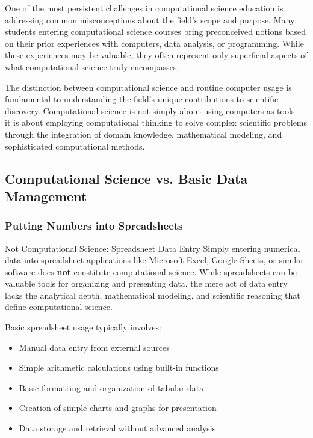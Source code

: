 One of the most persistent challenges in computational science education is addressing common misconceptions about the field's scope and purpose. Many students entering computational science courses bring preconceived notions based on their prior experiences with computers, data analysis, or programming. While these experiences may be valuable, they often represent only superficial aspects of what computational science truly encompasses.

The distinction between computational science and routine computer usage is fundamental to understanding the field's unique contributions to scientific discovery. Computational science is not simply about using computers as tools—it is about employing computational thinking to solve complex scientific problems through the integration of domain knowledge, mathematical modeling, and sophisticated computational methods.

\subsection{Computational Science vs. Basic Data Management}

\subsubsection{Putting Numbers into Spreadsheets}

\begin{conceptcard}{Not Computational Science: Spreadsheet Data Entry}
Simply entering numerical data into spreadsheet applications like Microsoft Excel, Google Sheets, or similar software does \textbf{not} constitute computational science. While spreadsheets can be valuable tools for organizing and presenting data, the mere act of data entry lacks the analytical depth, mathematical modeling, and scientific reasoning that define computational science.
\end{conceptcard}

Basic spreadsheet usage typically involves:
\begin{itemize}
    \item Manual data entry from external sources
    \item Simple arithmetic calculations using built-in functions
    \item Basic formatting and organization of tabular data
    \item Creation of simple charts and graphs for presentation
    \item Data storage and retrieval without advanced analysis
\end{itemize}

